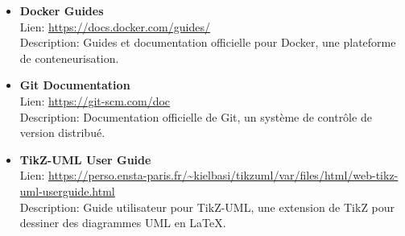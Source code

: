 \documentclass[12pt, french]{extreport}
\begin{document}
\begin{itemize}
    \item \textbf{Docker Guides} \\
    Lien: \url{https://docs.docker.com/guides/} \\
    Description: Guides et documentation officielle pour Docker, une plateforme de conteneurisation.

    \item \textbf{Git Documentation} \\
    Lien: \url{https://git-scm.com/doc} \\
    Description: Documentation officielle de Git, un système de contrôle de version distribué.

    \item \textbf{TikZ-UML User Guide} \\
    Lien: \url{https://perso.ensta-paris.fr/~kielbasi/tikzuml/var/files/html/web-tikz-uml-userguide.html} \\
    Description: Guide utilisateur pour TikZ-UML, une extension de TikZ pour dessiner des diagrammes UML en LaTeX.
\end{itemize}
\end{document}
